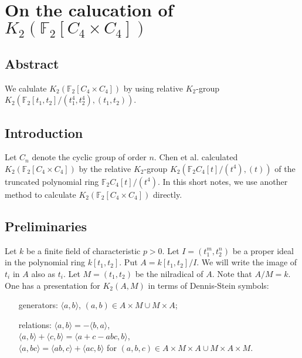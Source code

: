 \chapter{On the calucation of $K_2(\mathbb{F}_2[C_4\times C_4])$}

\section{Abstract}
We calulate $K_2(\mathbb{F}_2[C_4\times C_4])$ by using relative $K_2$-group $K_2(\mathbb{F}_2[t_1,t_2]/(t_1^4,t_2^4),(t_1,t_2))$.




\section{Introduction}
Let $C_n$ denote the cyclic group of order $n$. Chen et al.\cite{陈虹:419} calculated $K_2(\mathbb{F}_2[C_4\times C_4])$ by the relative $K_2$-group $K_2(\mathbb{F}_2C_4[t]/(t^4),(t))$ of the truncated polynomial ring $\mathbb{F}_2C_4[t]/(t^4)$. In this short notes, we use another method to calculate $K_2(\mathbb{F}_2[C_4\times C_4])$ directly.
\section{Preliminaries}
Let $k$ be a finite field of characteristic $p>0$. Let $I=(t_1^m,t_2^n)$ be a proper ideal in the polynomial ring $k[t_1,t_2]$. Put $A=k[t_1,t_2]/I$. We will write the image of $t_i$ in $A$ also as $t_i$. Let $M=(t_1,t_2)$ be the nilradical of $A$. Note that $A/M=k$. One has a presentation for $K_2(A,M)$ in terms of Dennis-Stein symbols:
\begin{itemize}
	\item[generators:]   $\langle a,b \rangle $, $(a,b)\in A\times M \cup M \times A$;
	\item[relations:] $\langle a,b\rangle = -\langle b,a \rangle$, \\
	$\langle a,b\rangle +\langle c,b \rangle=\langle a+c-abc,b\rangle$, \\
	 $\langle a,bc\rangle =\langle ab,c\rangle +\langle ac,b\rangle$ for $(a,b,c)\in A\times M \times A \cup M\times A\times M$.
\end{itemize}

